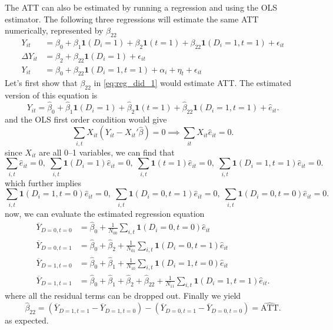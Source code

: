 \documentclass[12pt]{article}
\begin{document}
The ATT can also be estimated by running a regression and using the OLS estimator. The following
three regressions will estimate the same ATT numerically, represented by \( \beta_{22} \)
\begin{align}
  Y_{it} &= \beta_0 + \beta_1 \mathbf{1}(D_i=1) + \beta_2 \mathbf{1}(t=1) + \beta_{22}
  \mathbf{1}(D_i=1,t=1) + \epsilon_{it}\label{eq:reg_did_1} \\
  \Delta Y_{it} &= \beta_2 + \beta_{22} \mathbf{1}(D_i=1) + \epsilon_{it} \label{eq:reg_did_2}\\
  Y_{it} &= \beta_0 + \beta_{22} \mathbf{1}(D_i=1,t=1) + \alpha_i + \eta_t +
  \epsilon_{it}\label{eq:reg_did_3}
\end{align}
Let's first show that \( \beta_{22} \) in \eqref{eq:reg_did_1} would estimate ATT. The estimated
version of this equation is
\[
  Y_{it} = \hat{\beta}_0  + \hat{\beta}_1  \mathbf{1}(D_i=1) + \hat{\beta}_2
  \mathbf{1}(t=1) + \hat{\beta}_{22}
  \mathbf{1}(D_i=1,t=1) + \hat{e}_{it}
.\]
and the OLS first order condition would give
\[
  \sum_{i,t} X_{it}(Y_{it}-X_{it}' \hat{\beta} ) = 0 \implies \sum_{it} X_{it} \hat{e}_{it} = 0
.\]
since \( X_{it} \) are all 0--1 variables, we can find that
\[
  \sum_{i,t} \hat{e}_{it} = 0, \; \sum_{i,t} \mathbf{1}(D_i=1)\hat{e}_{it}=0, \;
  \sum_{i,t} \mathbf{1}(t=1) \hat{e}_{it}=0, \; \sum_{i,t} \mathbf{1}(D_i=1,t=1) \hat{e}_{it} = 0
.\]
which further implies
\[
  \sum_{i,t}\mathbf{1}(D_i=1,t=0) \hat{e}_{it} = 0, \;
  \sum_{i,t}\mathbf{1}(D_i=0,t=1) \hat{e}_{it} = 0, \;
  \sum_{i,t}\mathbf{1}(D_i=0,t=0) \hat{e}_{it} = 0
.\]
now, we can evaluate the estimated regression equation
\begin{align*}
  \overline{Y}_{D=0,t=0} &= \hat{\beta}_0 + \frac{1}{N_{00}}\sum_{i,t}\mathbf{1}(D_i=0,t=0)
  \hat{e}_{it} \\
  \overline{Y}_{D=0,t=1} &= \hat{\beta}_0 + \hat{\beta}_2 +
  \frac{1}{N_{01}}\sum_{i,t}\mathbf{1}(D_i=0,t=1) \hat{e}_{it}\\
  \overline{Y}_{D=1,t=0} &= \hat{\beta}_0 + \hat{\beta}_1 +
  \frac{1}{N_{10}}\sum_{i,t}\mathbf{1}(D_i=1,t=0) \hat{e}_{it}\\
  \overline{Y}_{D=1,t=1} &= \hat{\beta}_0 + \hat{\beta}_1 + \hat{\beta}_2 + \hat{\beta}_{22} +
  \frac{1}{N_{11}}\sum_{i,t}\mathbf{1}(D_i=1,t=1) \hat{e}_{it}
  .
\end{align*}
where all the residual terms can be dropped out. Finally we yield
\[
  \hat{\beta}_{22} = (\overline{Y}_{D=1,t=1}-\overline{Y}_{D=1,t=0}) -
  (\overline{Y}_{D=0,t=1}-\overline{Y}_{D=0,t=0} ) = \widehat{\text{ATT}}
.\]
as expected.
\end{document}
